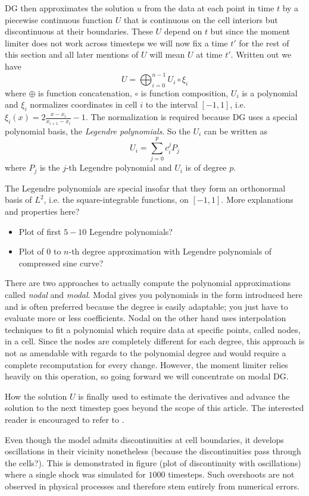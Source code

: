 DG then approximates the solution $u$ from the data at each point in time $t$ by a piecewise continuous function $U$ that is continuous on the cell interiors but discontinuous at their boundaries.
These $U$ depend on $t$ but since the moment limiter does not work across timesteps we will now fix a time $t'$ for the rest of this section and all later mentions of $U$ will mean $U$ at time $t'$.
Written out we have
\begin{equation*}
  U = \bigoplus_{i = 0}^{n - 1} U_{i} \circ \xi_{i}
\end{equation*}
where $\oplus$ is function concatenation, $\circ$ is function composition, $U_{i}$ is a polynomial and $\xi_{i}$ normalizes coordinates in cell $i$ to the interval $[-1, 1]$, i.e. $\xi_{i}(x) = 2 \frac{x - x_{i}}{x_{i + 1} - x_{i}} - 1$.
The normalization is required because DG uses a special polynomial basis, the \emph{Legendre polynomials}.
So the $U_{i}$ can be written as
\begin{equation*}
  U_{i} = \sum_{j = 0}^{p} c_{i}^{j} P_{j}
\end{equation*}
where $P_{j}$ is the $j$-th Legendre polynomial and $U_{i}$ is of degree $p$.

The Legendre polynomials are special insofar that they form an orthonormal basis of $L^{2}$, i.e. the square-integrable functions, on $[-1, 1]$.
More explanations and properties here?
\begin{itemize}
\item Plot of first $5-10$ Legendre polynomials?
\item Plot of $0$ to $n$-th degree approximation with Legendre polynomials of compressed sine curve?
\end{itemize}

There are two approaches to actually compute the polynomial approximations called \emph{nodal} and \emph{modal}.
Modal gives you polynomials in the form introduced here and is often preferred because the degree is easily adaptable; you just have to evaluate more or less coefficients.
Nodal on the other hand uses interpolation techniques to fit a polynomial which require data at specific points, called nodes, in a cell.
Since the nodes are completely different for each degree, this approach is not as amendable with regards to the polynomial degree and would require a complete recomputation for every change.
However, the moment limiter relies heavily on this operation, so going forward we will concentrate on modal DG.

How the solution $U$ is finally used to estimate the derivatives and advance the solution to the next timestep goes beyond the scope of this article.
The interested reader is encouraged to refer to \cite[chapter 3]{Hesthaven2007}.

Even though the model admits discontinuities at cell boundaries, it develops oscillations in their vicinity nonetheless (because the discontinuities pass through the cells?).
This is demonstrated in figure (plot of discontinuity with oscillations) where a single shock was simulated for $1000$ timesteps.
Such overshoots are not observed in physical processes and therefore stem entirely from numerical errors.

